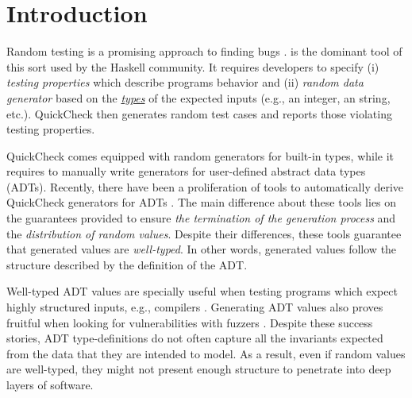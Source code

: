 \section{Introduction}

Random testing is a promising approach to finding bugs
\cite{HughesNSA16,HughesPAN16,ArtsHNS15}.
%
\quickcheck \cite{ClaessenH00} is the dominant tool of this sort used by the
Haskell community.
%
It requires developers to specify (i) \emph{testing properties} which describe
programs behavior and (ii) \emph{random data generator} based on the
\underline{\emph{types}} of the expected inputs (e.g., an integer, an string,
etc.). %
%
QuickCheck then generates random test cases and reports those violating testing
properties.
%

QuickCheck comes equipped with random generators for built-in types, while it
requires to manually write generators for user-defined abstract data types
(ADTs).
%
Recently, there have been a proliferation of tools to automatically derive
QuickCheck generators for ADTs
\cite{mitchell2007,RuncimanNL08,DuregardJW12,grieco2017,DBLP:conf/haskell/MistaRH18}.
%
The main difference about these tools lies on the guarantees provided to ensure
\emph{the termination of the generation process} and the \emph{distribution of
  random values}.
%
Despite their differences, these tools guarantee that generated values are
\emph{well-typed}.
%
In other words, generated values follow the structure described by the
definition of the ADT.
%

Well-typed ADT values are specially useful when testing programs which expect
highly structured inputs, e.g., compilers \cite{Palka11,MidtgaardJKNN17}.
%
Generating ADT values also proves fruitful when looking for vulnerabilities with
fuzzers \cite{GriecoCB16,grieco2017}.
%
%
Despite these success stories, ADT type-definitions do not often capture all the
invariants expected from the data that they are intended to model.
%
As a result, even if random values are well-typed, they might not present enough
structure to penetrate into deep layers of software.

